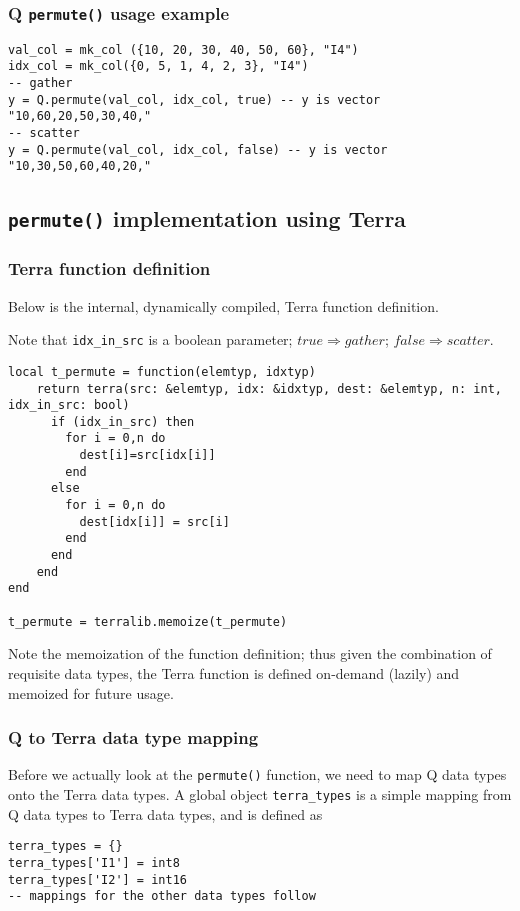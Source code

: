 \subsubsection{Q {\tt permute()} usage example}
\begin{verbatim}
val_col = mk_col ({10, 20, 30, 40, 50, 60}, "I4")
idx_col = mk_col({0, 5, 1, 4, 2, 3}, "I4")
-- gather
y = Q.permute(val_col, idx_col, true) -- y is vector "10,60,20,50,30,40," 
-- scatter
y = Q.permute(val_col, idx_col, false) -- y is vector "10,30,50,60,40,20,"
\end{verbatim}

\subsection{{\tt permute()} implementation using Terra} \label{terraPermute}
\subsubsection{Terra function definition}
Below is the internal, dynamically compiled, Terra function definition.

Note that {\tt idx\_in\_src} is a boolean parameter; \(true \Rightarrow gather\); \(false \Rightarrow scatter\).

\begin{verbatim}
local t_permute = function(elemtyp, idxtyp)
    return terra(src: &elemtyp, idx: &idxtyp, dest: &elemtyp, n: int, idx_in_src: bool)
      if (idx_in_src) then
        for i = 0,n do
          dest[i]=src[idx[i]]
        end
      else
        for i = 0,n do
          dest[idx[i]] = src[i]
        end
      end
    end
end

t_permute = terralib.memoize(t_permute)
\end{verbatim}

Note the memoization of the function definition; thus given the combination of requisite data types, the Terra function is defined on-demand (lazily) and memoized for future usage.

\subsubsection{Q to Terra data type mapping}
Before we actually look at the {\tt permute()} function, we need to map Q data types onto the Terra data types. A global object {\tt terra\_types} is a simple mapping from Q data types to Terra data types, and is defined as
\begin{verbatim}
terra_types = {} 
terra_types['I1'] = int8
terra_types['I2'] = int16
-- mappings for the other data types follow
\end{verbatim}

